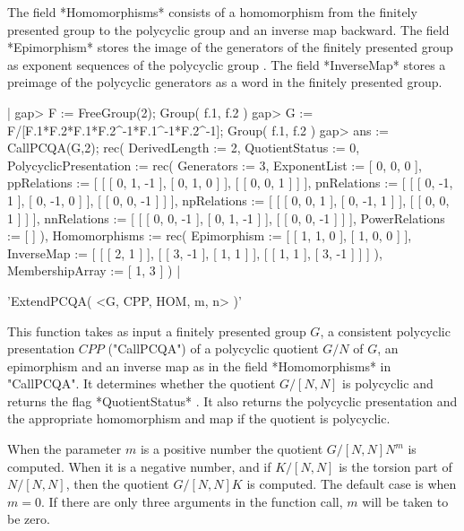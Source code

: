 The field  *Homomorphisms* consists of a  homomorphism from the  finitely
presented group to the polycyclic group and an inverse map backward.  The
field  *Epimorphism*  stores the image of the generators of the  finitely
presented group as exponent sequences of the polycyclic group . The field
*InverseMap* stores a preimage of the polycyclic generators as a  word in
the finitely presented group.

|
    gap> F := FreeGroup(2);
    Group( f.1, f.2 )
    gap> G := F/[F.1*F.2*F.1*F.2^-1*F.1^-1*F.2^-1];
    Group( f.1, f.2 )
    gap> ans := CallPCQA(G,2);
    rec(
      DerivedLength := 2,
      QuotientStatus := 0,
      PolycyclicPresentation := rec(
          Generators := 3,
          ExponentList := [ 0, 0, 0 ],
          ppRelations := [ [ [ 0, 1, -1 ], [ 0, 1, 0 ] ],
	                   [ [ 0, 0, 1 ] ] ],
          pnRelations := [ [ [ 0, -1, 1 ], [ 0, -1, 0 ] ],
	                   [ [ 0, 0, -1 ] ] ],
          npRelations := [ [ [ 0, 0, 1 ], [ 0, -1, 1 ] ],
	                   [ [ 0, 0, 1 ] ] ],
          nnRelations := [ [ [ 0, 0, -1 ], [ 0, 1, -1 ] ],
	                   [ [ 0, 0, -1 ] ] ],
          PowerRelations := [  ] ),
      Homomorphisms := rec(
          Epimorphism := [ [ 1, 1, 0 ], [ 1, 0, 0 ] ],
          InverseMap := [ [ [ 2, 1 ] ], [ [ 3, -1 ], [ 1, 1 ] ],
	                  [ [ 1, 1 ], [ 3, -1 ] ] ] ),
      MembershipArray := [ 1, 3 ] )
|



'ExtendPCQA( <G, CPP, HOM, m, n> )'

This function takes as input a finitely presented group $G$, a consistent
polycyclic presentation $CPP$ ("CallPCQA") of a polycyclic quotient $G/N$
of $G$, an epimorphism and an inverse map as in the field *Homomorphisms*
in "CallPCQA". It determines whether the quotient $G/[N,N]$ is polycyclic
and  returns the flag *QuotientStatus* . It also  returns the  polycyclic
presentation and the appropriate homomorphism and map if the quotient  is
polycyclic.

When the parameter $m$ is a positive number the quotient  $G/[N,N]N^m$ is
computed.  When it is a negative number,  and if $K/[N,N]$ is the torsion
part of $N/[N,N]$, then the quotient $G/[N,N]K$ is computed.  The default
case is when $m = 0$.  If there are only  three arguments in the function
call, $m$ will be taken to be zero.

